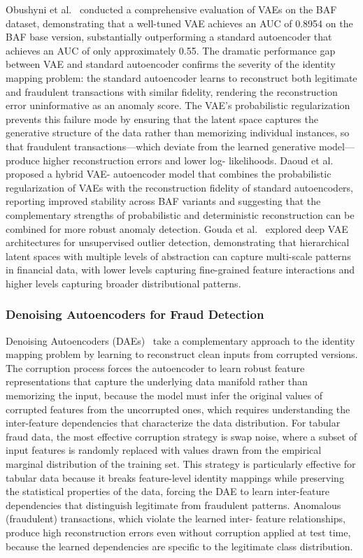 Obushyni et al.~\cite{obushyni2025vae} conducted a comprehensive evaluation of
VAEs on the BAF dataset, demonstrating that a well-tuned VAE achieves an AUC of
0.8954 on the BAF base version, substantially outperforming a standard
autoencoder that achieves an AUC of only approximately 0.55. The dramatic
performance gap between VAE and standard autoencoder confirms the severity of
the identity mapping problem: the standard autoencoder learns to reconstruct
both legitimate and fraudulent transactions with similar fidelity, rendering the
reconstruction error uninformative as an anomaly score. The VAE's probabilistic
regularization prevents this failure mode by ensuring that the latent space
captures the generative structure of the data rather than memorizing individual
instances, so that fraudulent transactions---which deviate from the learned
generative model---produce higher reconstruction errors and lower log-
likelihoods. Daoud et al.~\cite{daoud2025hybrid} proposed a hybrid VAE-
autoencoder model that combines the probabilistic regularization of VAEs with
the reconstruction fidelity of standard autoencoders, reporting improved
stability across BAF variants and suggesting that the complementary strengths of
probabilistic and deterministic reconstruction can be combined for more robust
anomaly detection. Gouda et al.~\cite{gouda2022deepvae} explored deep VAE
architectures for unsupervised outlier detection, demonstrating that
hierarchical latent spaces with multiple levels of abstraction can capture
multi-scale patterns in financial data, with lower levels capturing fine-grained
feature interactions and higher levels capturing broader distributional
patterns.

\subsubsection{Denoising Autoencoders for Fraud Detection}

Denoising Autoencoders (DAEs)~\cite{vincent2010stacked} take a complementary
approach to the identity mapping problem by learning to reconstruct clean inputs
from corrupted versions. The corruption process forces the autoencoder to learn
robust feature representations that capture the underlying data manifold rather
than memorizing the input, because the model must infer the original values of
corrupted features from the uncorrupted ones, which requires understanding the
inter-feature dependencies that characterize the data distribution. For tabular
fraud data, the most effective corruption strategy is swap noise, where a subset
of input features is randomly replaced with values drawn from the empirical
marginal distribution of the training set. This strategy is particularly
effective for tabular data because it breaks feature-level identity mappings
while preserving the statistical properties of the data, forcing the DAE to
learn inter-feature dependencies that distinguish legitimate from fraudulent
patterns. Anomalous (fraudulent) transactions, which violate the learned inter-
feature relationships, produce high reconstruction errors even without
corruption applied at test time, because the learned dependencies are specific
to the legitimate class distribution.

